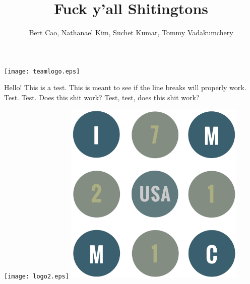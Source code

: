 \documentclass[letterpaper]{article}
\title{Fuck y'all Shitingtons}
\author{Bert Cao, Nathanael Kim, Suchet Kumar, Tommy Vadakumchery}
\begin{document}
	\begin{center}
		\texttt{[image: teamlogo.eps]}
	\end{center}
		Hello! This is a test. This is meant to see if the line breaks will properly work. Test. Test. Does this shit work? Test, test, does this shit work?
	\newpage
	\begin{center}
		\texttt{[image: logo2.eps]}
		\includegraphics[width=0.65\textwidth]{love.eps}
	\end{center}

	\maketitle

	\newpage
	\tableofcontents
	\newpage

	
	
	
	
	
	
	
	
\end{document}
